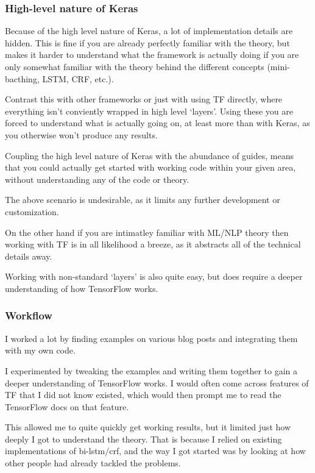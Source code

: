 \subsubsection*{High-level nature of Keras}

Because of the high level nature of Keras, a lot of implementation details are
hidden. This is fine if you are already perfectly familiar with the theory, but
makes it harder to understand what the framework is actually doing if you are
only somewhat familiar with the theory behind the different concepts
(mini-bacthing, LSTM, CRF, etc.).

Contrast this with other frameworks or just with using TF directly, where
everything isn't conviently wrapped in high level `layers'. Using these you are
forced to understand what is actually going on, at least more than with Keras,
as you otherwise won't produce any results.

Coupling the high level nature of Keras with the abundance of guides, means that
you could actually get started with working code within your given area, without
understanding any of the code or theory.

The above scenario is undesirable, as it limits any further development or
customization.

On the other hand if you are intimatley familiar with ML/NLP theory then
working with TF is in all likelihood a breeze, as it abstracts all of the
technical details away.

Working with non-standard `layers' is also quite easy, but does require a
deeper understanding of how TensorFlow works.

\subsubsection*{Workflow}

I worked a lot by finding examples on various blog posts and integrating them
with my own code.

I experimented by tweaking the examples and writing them together to
gain a deeper understanding of TensorFlow works. I would often come across
features of TF that I did not know existed, which would then prompt me to read
the TensorFlow docs on that feature.

This allowed me to quite quickly get working results, but it limited just how
deeply I got to understand the theory. That is because I relied on existing
implementations of bi-lstm/crf, and the way I got started was by looking at how
other people had already tackled the problems.

